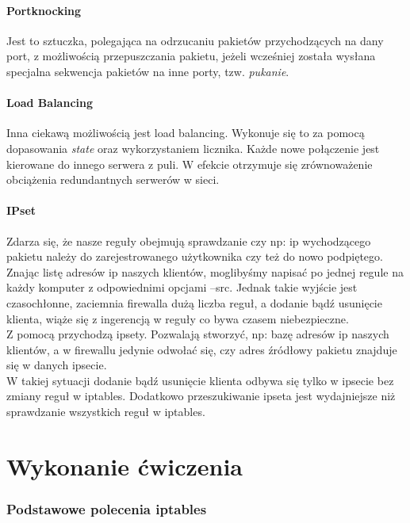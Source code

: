 \documentclass[a4paper,11pt]{article}
\begin{document}
\subsection{Portknocking}
Jest to sztuczka, polegająca na odrzucaniu pakietów przychodzących na dany port, z możliwością przepuszczania pakietu, jeżeli wcześniej została wysłana specjalna sekwencja pakietów na inne porty, tzw. \textit{pukanie}.
\subsection{Load Balancing}
Inna ciekawą możliwością jest load balancing. Wykonuje się to za pomocą dopasowania \textit{state} oraz wykorzystaniem licznika. Każde nowe połączenie jest kierowane do innego serwera z puli. W efekcie otrzymuje się zrównoważenie obciążenia redundantnych serwerów w sieci.
\subsection{IPset}
Zdarza się, że nasze reguły obejmują sprawdzanie czy np: ip wychodzącego pakietu należy do zarejestrowanego użytkownika czy też do nowo podpiętego. Znając listę adresów ip naszych klientów, moglibyśmy napisać po jednej regule na każdy komputer z odpowiednimi opcjami --src. Jednak takie wyjście jest czasochłonne, zaciemnia firewalla dużą liczba reguł, a dodanie bądź usunięcie klienta, wiąże się z ingerencją w reguły co bywa czasem niebezpieczne.\\
Z pomocą przychodzą ipsety. Pozwalają stworzyć, np: bazę adresów ip naszych klientów, a w firewallu jedynie odwołać się, czy adres źródłowy pakietu znajduje się w danych ipsecie.\\
W takiej sytuacji dodanie bądź usunięcie klienta odbywa się tylko w ipsecie bez zmiany reguł w iptables. Dodatkowo przeszukiwanie ipseta jest wydajniejsze niż sprawdzanie wszystkich reguł w iptables.
\part{Wykonanie ćwiczenia}
\section{Podstawowe polecenia iptables}
\end{document}
